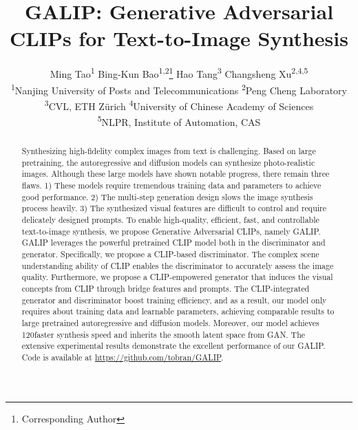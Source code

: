 \documentclass[10pt,twocolumn,letterpaper]{article}
\begin{document}
\title{GALIP: Generative Adversarial CLIPs for Text-to-Image Synthesis}


\author{Ming Tao\textsuperscript{1} \quad 
Bing-Kun Bao\textsuperscript{1,2}\thanks{Corresponding Author} \quad
Hao Tang\textsuperscript{3} \quad 
Changsheng Xu\textsuperscript{2,4,5} \\
\textsuperscript{1}Nanjing University of Posts and Telecommunications \quad  
\textsuperscript{2}Peng Cheng Laboratory \quad \\
\textsuperscript{3}CVL, ETH Zürich \quad 
\textsuperscript{4}University of Chinese Academy of Sciences \\
\textsuperscript{5}NLPR, Institute of Automation, CAS \\
}


\maketitle

\begin{abstract}
Synthesizing high-fidelity complex images from text is challenging.
Based on large pretraining, the autoregressive and diffusion models can synthesize photo-realistic images.
Although these large models have shown notable progress, there remain three flaws.
1) These models require tremendous training data and parameters to achieve good performance.
2) The multi-step generation design slows the image synthesis process heavily.
3) The synthesized visual features are difficult to control and require delicately designed prompts.
To enable high-quality, efficient, fast, and controllable text-to-image synthesis, we propose Generative Adversarial CLIPs, namely GALIP.
GALIP leverages the powerful pretrained CLIP model both in the discriminator and generator.
Specifically, we propose a CLIP-based discriminator.
The complex scene understanding ability of CLIP enables the discriminator to accurately assess the image quality.
Furthermore, we propose a CLIP-empowered generator that induces the visual concepts from CLIP through bridge features and prompts.
The CLIP-integrated generator and discriminator boost training efficiency, and as a result, our model only requires about  training data and  learnable parameters, 
achieving comparable results to large pretrained autoregressive and diffusion models.
Moreover, our model achieves 120faster synthesis speed and inherits the smooth latent space from GAN.
The extensive experimental results demonstrate the excellent performance of our GALIP.
Code is available at \url{https://github.com/tobran/GALIP}.
\end{abstract}
\end{document}

